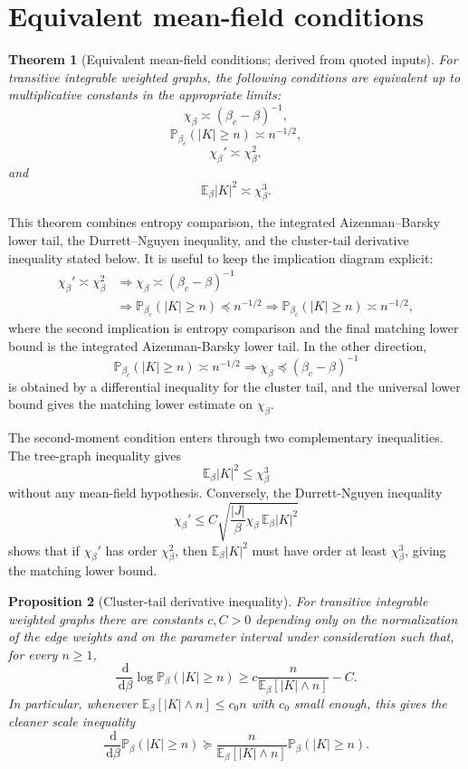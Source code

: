 \documentclass[11pt,reqno]{book}
\numberwithin{equation}{chapter}
\theoremstyle{plain}
\newtheorem{theorem}{Theorem}[chapter]
\newtheorem{prop}[theorem]{Proposition}
\theoremstyle{definition}
\theoremstyle{remark}
\newcommand{\Eb}{\mathbb E_\beta}
\renewcommand{\P}{\mathbb P}
\newcommand{\1}{\mathbf 1}
\newcommand{\dd}{\,\mathrm d}
\newcommand{\pre}{\preceq}
\newcommand{\suc}{\succeq}
\begin{document}
\section{Equivalent mean-field conditions}

\begin{theorem}[Equivalent mean-field conditions; derived from quoted inputs]
\label{thm:equivalent-mean-field-conditions}
For transitive integrable weighted graphs, the following conditions are
equivalent up to multiplicative constants in the appropriate limits:
\[
  \chi_\beta\asymp(\beta_c-\beta)^{-1},
\]
\[
  \P_{\beta_c}(|K|\geq n)\asymp n^{-1/2},
\]
\[
  \chi_\beta'\asymp \chi_\beta^2,
\]
and
\[
  \Eb |K|^2\asymp \chi_\beta^3.
\]
\end{theorem}

This theorem combines entropy comparison, the integrated Aizenman--Barsky
lower tail, the Durrett--Nguyen inequality, and the cluster-tail derivative
inequality stated below. It is useful to keep the implication diagram explicit:
\[
\begin{aligned}
\chi_\beta'\asymp\chi_\beta^2
&\Longrightarrow
\chi_\beta\asymp(\beta_c-\beta)^{-1}
\\
&\Longrightarrow
\P_{\beta_c}(|K|\geq n)\pre n^{-1/2}
\Longrightarrow
\P_{\beta_c}(|K|\geq n)\asymp n^{-1/2},
\end{aligned}
\]
where the second implication is entropy comparison and the final matching lower bound is the integrated Aizenman-Barsky lower tail. In the other direction,
\[
  \P_{\beta_c}(|K|\geq n)\asymp n^{-1/2}
  \Longrightarrow
  \chi_\beta\pre(\beta_c-\beta)^{-1}
\]
is obtained by a differential inequality for the cluster tail, and the universal lower bound gives the matching lower estimate on \(\chi_\beta\).

The second-moment condition enters through two complementary inequalities. The tree-graph inequality gives
\[
  \Eb |K|^2\leq \chi_\beta^3
\]
without any mean-field hypothesis. Conversely, the Durrett-Nguyen inequality
\[
  \chi_\beta'
  \leq
  C\sqrt{\frac{|J|}{\beta}\chi_\beta\,\Eb |K|^2}
\]
shows that if \(\chi_\beta'\) has order \(\chi_\beta^2\), then \(\Eb |K|^2\) must have order at least \(\chi_\beta^3\), giving the matching lower bound.

\begin{prop}[Cluster-tail derivative inequality]
\label{prop:cluster-tail-derivative}
For transitive integrable weighted graphs there are constants \(c,C>0\)
depending only on the normalization of the edge weights and on the parameter
interval under consideration such that, for every \(n\geq1\),
\[
  \frac{\dd}{\dd\beta}\log \P_\beta(|K|\geq n)
  \geq
  c\frac{n}{\Eb[|K|\wedge n]}-C.
\]
In particular, whenever \(\Eb[|K|\wedge n]\leq c_0n\) with \(c_0\) small
enough, this gives the cleaner scale inequality
\[
  \frac{\dd}{\dd\beta}\P_\beta(|K|\geq n)
  \suc
  \frac{n}{\Eb[|K|\wedge n]}
  \P_\beta(|K|\geq n).
\]
\end{prop}
\end{document}
